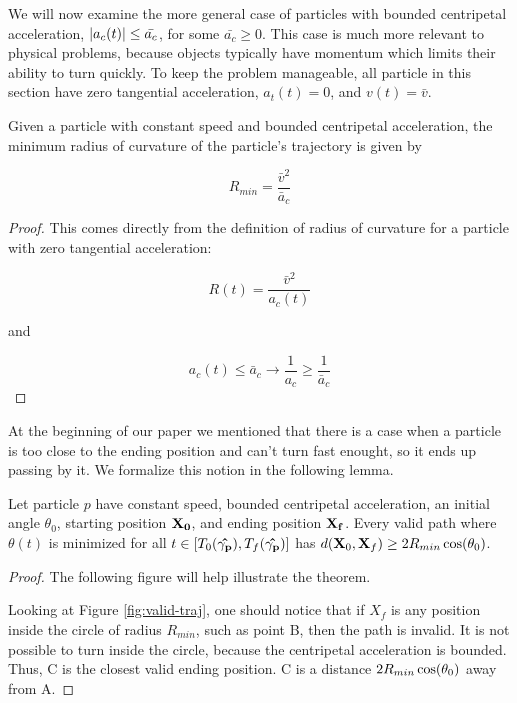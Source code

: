 We will now examine the more general case of particles with bounded centripetal acceleration, $\abs{a_c(t)} \le \bar{a_c}$, for some $\bar{a_c} \ge 0$. This case is much more relevant to physical problems, because objects typically have momentum which limits their ability to turn quickly. To keep the problem manageable, all particle in this section have zero tangential acceleration, $a_t(t) = 0$, and $v(t) = \bar{v}$.

\begin{lemma} \label{lem:r-curve}
  Given a particle with constant speed and bounded centripetal acceleration, the minimum radius of curvature of the particle's trajectory is given by

  \begin{equation}
    R_{min} = \frac{\bar{v}^2}{\bar{a}_c}
  \end{equation}
  \end{lemma}

\begin{proof}

This comes directly from the definition of radius of curvature for a particle with zero tangential acceleration:

\[
  R(t) = \frac{\bar{v}^2}{a_c(t)}
\]

and 

\[
  a_c(t) \le \bar{a}_c \to \frac{1}{a_c} \ge \frac{1}{\bar{a}_c}
\]
\end{proof}

At the beginning of our paper we mentioned that there is a case when a particle is too close to the ending position and can't turn fast enought, so it ends up passing by it. We formalize this notion in the following lemma.

\begin{lemma}\label{lem:too-close}
  Let particle $p$ have constant speed, bounded centripetal acceleration, an initial angle $\theta_0$, starting position $\mathbf{X_0}$, and ending position $\mathbf{X_f}$. Every valid path where $\theta(t)$ is minimized for all $t \in [T_0(\mathbf{\hat{\gamma_p}}), T_f(\mathbf{\hat{\gamma_p}})]$ has $d(\bvec{X}_0, \bvec{X}_f) \ge 2 R_{min} \cos\paren{\theta_0}$.
\end{lemma}

\begin{proof}

  The following figure will help illustrate the theorem.


  Looking at Figure \ref{fig:valid-traj}, one should notice that if $X_f$ is any position inside the circle of radius $R_{min}$, such as point B, then the path is invalid. It is not possible to turn inside the circle, because the centripetal acceleration is bounded. Thus, C is the closest valid ending position. C is a distance $2 R_{min} \cos\paren{\theta_0}$ away from A.

\end{proof}

